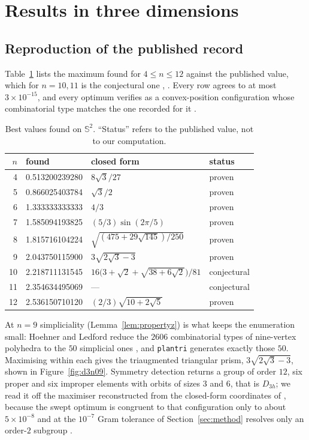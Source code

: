 \section{Results in three dimensions}
\label{sec:results3}

\subsection{Reproduction of the published record}

Table~\ref{tab:d3} lists the maximum found for $4 \leq n \leq 12$
 against the published value, which for $n = 10, 11$ is the
conjectural one , . Every row agrees
to at most $3 \times 10^{-15}$, and every optimum verifies as a convex-position
configuration whose combinatorial type matches the one recorded for it
.

\begin{table}[ht]
  \caption{Best values found on $\mathbb{S}^{2}$. ``Status'' refers to the
    published value, not to our computation.}
  \label{tab:d3}
  \begin{tabular}{rll l}
    \toprule
    $n$ & found & closed form & status \\
    \midrule
    4  & 0.513200239280 & $8\sqrt{3}/27$ & proven \\
    5  & 0.866025403784 & $\sqrt{3}/2$ & proven \\
    6  & 1.333333333333 & $4/3$ & proven \\
    7  & 1.585094193825 & $(5/3)\sin(2\pi/5)$ & proven \\
    8  & 1.815716104224 & $\sqrt{(475 + 29\sqrt{145})/250}$ & proven \\
    9  & 2.043750115900 & $3\sqrt{2\sqrt{3}-3}$ & proven \\
    10 & 2.218711131545 & $16\bigl(3 + \sqrt{2} +
         \sqrt{38 + 6\sqrt{2}}\bigr)/81$ & conjectural \\
    11 & 2.354634495069 & --- & conjectural \\
    12 & 2.536150710120 & $(2/3)\sqrt{10 + 2\sqrt{5}}$ & proven \\
    \bottomrule
  \end{tabular}
\end{table}

At $n = 9$ simpliciality (Lemma~\ref{lem:propertyz}) is what keeps the
enumeration small: Hoehner and Ledford reduce the $2606$ combinatorial types of nine-vertex polyhedra to the
$50$ simplicial ones \cite{hoehner-ledford-2026}, and \texttt{plantri}
generates exactly those $50$. Maximising within each gives the triaugmented
triangular prism, $3\sqrt{2\sqrt{3}-3}$, shown in Figure~\ref{fig:d3n09}.
Symmetry detection returns a group of order $12$, six proper and six improper
elements with orbits of sizes $3$ and $6$, that is $D_{3h}$; we read it off the
maximiser reconstructed from the closed-form coordinates of
\cite{hoehner-ledford-2026}, because the swept optimum is congruent to that
configuration only to about $5 \times 10^{-8}$ and at the $10^{-7}$ Gram tolerance of
Section~\ref{sec:method} resolves only an order-$2$ subgroup .

